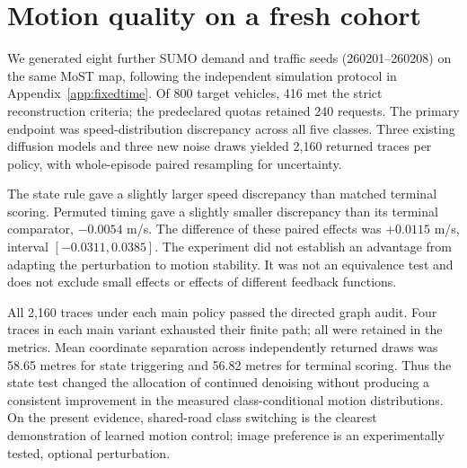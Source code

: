 \section{Motion quality on a fresh cohort}
We generated eight further SUMO demand and traffic seeds (260201--260208) on the same MoST map, following the independent simulation protocol in Appendix~\ref{app:fixedtime}. Of 800 target vehicles, 416 met the strict reconstruction criteria; the predeclared quotas retained 240 requests. The primary endpoint was speed-distribution discrepancy across all five classes. Three existing diffusion models and three new noise draws yielded 2,160 returned traces per policy, with whole-episode paired resampling for uncertainty.

The state rule gave a slightly larger speed discrepancy than matched terminal scoring. Permuted timing gave a slightly smaller discrepancy than its terminal comparator, $-0.0054$ m/s. The difference of these paired effects was $+0.0115$ m/s, interval $[-0.0311,0.0385]$. The experiment did not establish an advantage from adapting the perturbation to motion stability. It was not an equivalence test and does not exclude small effects or effects of different feedback functions.

All 2,160 traces under each main policy passed the directed graph audit. Four traces in each main variant exhausted their finite path; all were retained in the metrics. Mean coordinate separation across independently returned draws was 58.65 metres for state triggering and 56.82 metres for terminal scoring. Thus the state test changed the allocation of continued denoising without producing a consistent improvement in the measured class-conditional motion distributions. On the present evidence, shared-road class switching is the clearest demonstration of learned motion control; image preference is an experimentally tested, optional perturbation.

